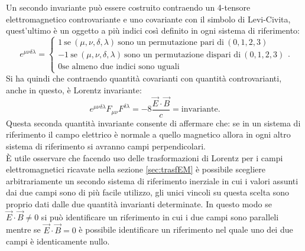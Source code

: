 Un secondo invariante può essere costruito contraendo un 4-tensore elettromagnetico controvariante e uno covariante con il simbolo di Levi-Civita, quest'ultimo è un oggetto a più indici così definito in ogni sistema di riferimento:
\begin{equation}
    e^{\mu\nu\delta\lambda}=\begin{cases}
        1\ \text{se}\ (\mu,\nu,\delta,\lambda)\ \text{sono un permutazione pari di}\ (0,1,2,3)\\
        -1\ \text{se}\ (\mu,\nu,\delta,\lambda)\ \text{sono un permutazione dispari di}\ (0,1,2,3)\\
        0 \text{se almeno due indici sono uguali}
    \end{cases}.\label{LeviCivita}
\end{equation}
Si ha quindi che contraendo quantità covarianti con quantità controvarianti, anche in questo, è Lorentz invariante:
\begin{equation}
    e^{\mu\nu\delta\lambda}F_{\mu\nu}F^{\delta\lambda}=-8\frac{\vec E\cdot\vec B}{c}=\text{invariante}.
\end{equation}
Questa seconda quantità invariante consente di affermare che: se in un sistema di riferimento il campo elettrico è normale a quello magnetico allora in ogni altro sistema di riferimento si avranno campi perpendicolari.\\ È utile osservare che facendo uso delle trasformazioni di Lorentz per i campi elettromagnetici ricavate nella sezione \ref{sec:trasfEM} è possibile scegliere arbitrariamente un secondo sistema di riferimento inerziale in cui i valori assunti dai due campi sono di più facile utilizzo, gli unici vincoli su questa scelta sono proprio dati dalle due quantità invarianti determinate. In questo modo se $\vec E \cdot \vec B\neq0$ si può identificare un riferimento in cui i due campi sono paralleli mentre se $\vec E \cdot \vec B=0$ è possibile identificare un riferimento nel quale uno dei due campi è identicamente nullo.\\

